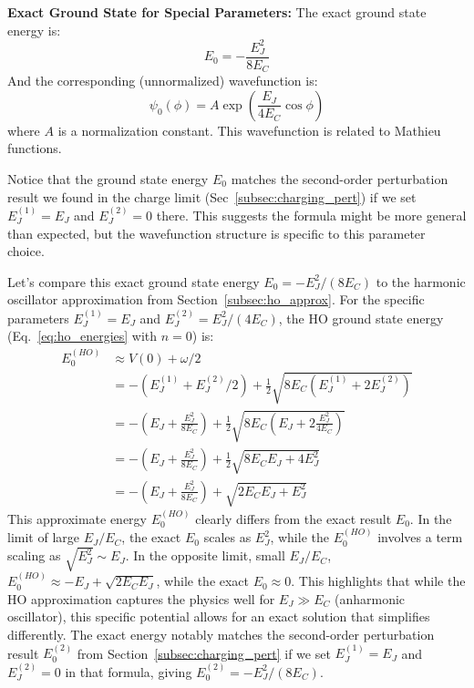 \documentclass{book}
\newenvironment{keyresult}[1][Key Result]{\begin{framed}\noindent\textbf{#1:}}{\end{framed}}
\begin{document}
\begin{keyresult}[Exact Ground State for Special Parameters]
\label{res:exact_gs}
The exact ground state energy is:
\[ E_0 = -\frac{E_J^2}{8 E_C} \]
And the corresponding (unnormalized) wavefunction is:
\[ \psi_0(\phi) = A \exp\left( \frac{E_J}{4 E_C} \cos \phi \right) \]
where \(A\) is a normalization constant. This wavefunction is related to Mathieu functions.
\end{keyresult}
Notice that the ground state energy \(E_0\) matches the second-order perturbation result we found in the charge limit (Sec~\ref{subsec:charging_pert}) if we set \(E_J^{(1)}=E_J\) and \(E_J^{(2)}=0\) there. This suggests the formula might be more general than expected, but the wavefunction structure is specific to this parameter choice.



Let's compare this exact ground state energy $E_0 = -E_J^2 / (8 E_C)$ to the harmonic oscillator approximation from Section~\ref{subsec:ho_approx}. For the specific parameters $E_J^{(1)}=E_J$ and $E_J^{(2)} = E_J^2 / (4 E_C)$, the HO ground state energy (Eq.~\ref{eq:ho_energies} with $n=0$) is:
\begin{align*}
E_0^{(HO)} &\approx V(0) + \omega/2 \\
&= -(E_J^{(1)} + E_J^{(2)}/2) + \frac{1}{2}\sqrt{8 E_C (E_J^{(1)} + 2 E_J^{(2)})} \\
&= -(E_J + \frac{E_J^2}{8 E_C}) + \frac{1}{2}\sqrt{8 E_C (E_J + 2 \frac{E_J^2}{4 E_C})} \\
&= -(E_J + \frac{E_J^2}{8 E_C}) + \frac{1}{2}\sqrt{8 E_C E_J + 4 E_J^2} \\
&= -(E_J + \frac{E_J^2}{8 E_C}) + \sqrt{2 E_C E_J + E_J^2} 
\end{align*}
This approximate energy $E_0^{(HO)}$ clearly differs from the exact result $E_0$. In the limit of large $E_J/E_C$, the exact $E_0$ scales as $E_J^2$, while the $E_0^{(HO)}$ involves a term scaling as $\sqrt{E_J^2} \sim E_J$. In the opposite limit, small $E_J/E_C$, $E_0^{(HO)} \approx -E_J + \sqrt{2 E_C E_J}$, while the exact $E_0 \approx 0$. This highlights that while the HO approximation captures the physics well for $E_J \gg E_C$ (anharmonic oscillator), this specific potential allows for an exact solution that simplifies differently. The exact energy notably matches the second-order perturbation result $E_0^{(2)}$ from Section~\ref{subsec:charging_pert} if we set $E_J^{(1)}=E_J$ and $E_J^{(2)}=0$ in that formula, giving $E_0^{(2)} = -E_J^2 / (8 E_C)$.
\end{document}
